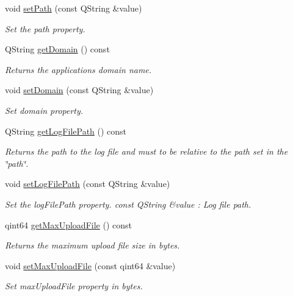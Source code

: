 \begin{DoxyCompactItemize}
void \hyperlink{class_configuration_ade67019de7f09f22093d920fc30152e5}{set\+Path} (const Q\+String \&value)
\begin{DoxyCompactList}\small\item\em Set the path property. \end{DoxyCompactList}\item 
Q\+String \hyperlink{class_configuration_ab58d8dc13a90745af4925e9b238c8cff}{get\+Domain} () const
\begin{DoxyCompactList}\small\item\em Returns the applications domain name. \end{DoxyCompactList}\item 
void \hyperlink{class_configuration_af31a608106ec376f01acc028ccb09cb8}{set\+Domain} (const Q\+String \&value)
\begin{DoxyCompactList}\small\item\em Set domain property. \end{DoxyCompactList}\item 
Q\+String \hyperlink{class_configuration_a005e1d10c605e08d73ff274f2b19fc48}{get\+Log\+File\+Path} () const
\begin{DoxyCompactList}\small\item\em Returns the path to the log file and must to be relative to the path set in the \char`\"{}path\char`\"{}. \end{DoxyCompactList}\item 
void \hyperlink{class_configuration_a83269c31da560355e67fdf452f7e24b0}{set\+Log\+File\+Path} (const Q\+String \&value)
\begin{DoxyCompactList}\small\item\em Set the log\+File\+Path property. const Q\+String \&value \+: Log file path. \end{DoxyCompactList}\item 
qint64 \hyperlink{class_configuration_a8bc88e3cfe151837ee77e213e441953e}{get\+Max\+Upload\+File} () const
\begin{DoxyCompactList}\small\item\em Returns the maximum upload file size in bytes. \end{DoxyCompactList}\item 
void \hyperlink{class_configuration_ada37d2f25a05d7b9fa5676f824b7e3be}{set\+Max\+Upload\+File} (const qint64 \&value)
\begin{DoxyCompactList}\small\item\em Set max\+Upload\+File property in bytes. \end{DoxyCompactList}\item 

\end{DoxyCompactItemize}
